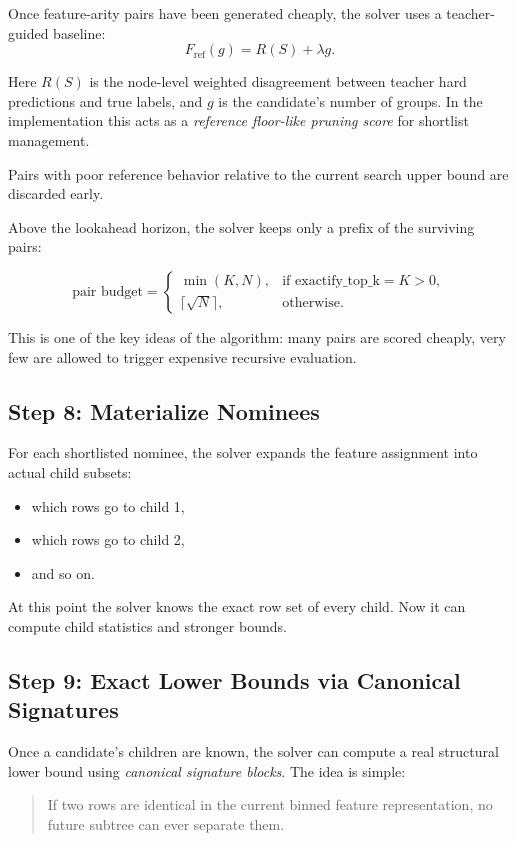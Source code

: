 \documentclass[11pt]{article}
\begin{document}
Once feature-arity pairs have been generated cheaply, the solver uses a teacher-guided baseline:
\[
F_{\mathrm{ref}}(g) = R(S) + \lambda g.
\]

Here \(R(S)\) is the node-level weighted disagreement between teacher hard predictions and true labels, and \(g\) is the candidate's number of groups. In the implementation this acts as a \emph{reference floor-like pruning score} for shortlist management.

Pairs with poor reference behavior relative to the current search upper bound are discarded early.

Above the lookahead horizon, the solver keeps only a prefix of the surviving pairs:

\[
\text{pair budget}
=
\begin{cases}
\min(K, N), & \text{if exactify\_top\_k} = K > 0, \\
\lceil \sqrt{N} \rceil, & \text{otherwise}.
\end{cases}
\]

This is one of the key ideas of the algorithm: many pairs are scored cheaply, very few are allowed to trigger expensive recursive evaluation.

\subsection{Step 8: Materialize Nominees}

For each shortlisted nominee, the solver expands the feature assignment into actual child subsets:

\begin{itemize}
\item which rows go to child 1,
\item which rows go to child 2,
\item and so on.
\end{itemize}

At this point the solver knows the exact row set of every child. Now it can compute child statistics and stronger bounds.

\subsection{Step 9: Exact Lower Bounds via Canonical Signatures}

Once a candidate's children are known, the solver can compute a real structural lower bound using \emph{canonical signature blocks}. The idea is simple:

\begin{quote}
If two rows are identical in the current binned feature representation, no future subtree can ever separate them.
\end{quote}
\end{document}
